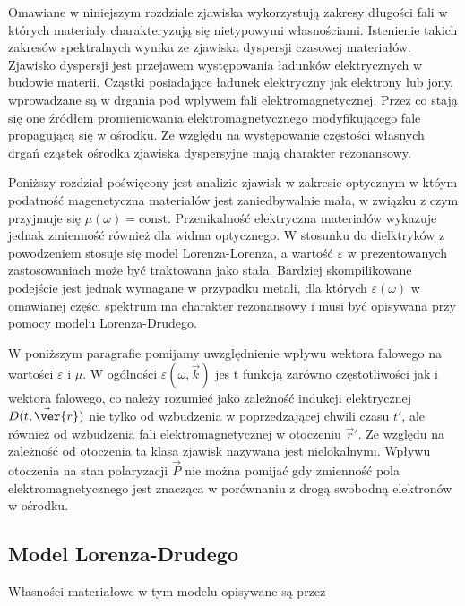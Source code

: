 Omawiane w niniejszym rozdziale zjawiska wykorzystują zakresy długości fali w których materiały charakteryzują się nietypowymi własnościami. Istenienie takich zakresów spektralnych wynika ze zjawiska dyspersji czasowej materiałów. Zjawisko dyspersji jest przejawem występowania ładunków elektrycznych w budowie materii. Cząstki posiadające ładunek elektryczny jak elektrony lub jony, wprowadzane są w drgania pod wpływem fali elektromagnetycznej. Przez co stają się one źródłem promieniowania elektromagnetycznego modyfikującego fale propagującą się w ośrodku. Ze względu na występowanie częstości własnych drgań cząstek ośrodka zjawiska dyspersyjne mają charakter rezonansowy.

Poniższy rozdział poświęcony jest analizie zjawisk w zakresie optycznym w któym podatność magenetyczna materiałów jest zaniedbywalnie mała, w związku z czym przyjmuje się $\mu(\omega)=\textrm{const}$. Przenikalność elektryczna materiałów wykazuje jednak zmienność również dla widma optycznego. W stosunku do dielktryków z powodzeniem stosuje się model Lorenza-Lorenza, a wartość $\varepsilon$ w prezentowanych zastosowaniach może być traktowana jako stała. Bardziej skompilikowane podejście jest jednak wymagane w przypadku metali, dla których $\varepsilon(\omega)$ w omawianej części spektrum ma charakter rezonansowy i musi być opisywana przy pomocy modelu Lorenza-Drudego.

W poniższym paragrafie pomijamy uwzględnienie wpływu wektora falowego na wartości $\varepsilon$ i $\mu$. W ogólności $\varepsilon(\omega,\vec{k})$ jes t funkcją zarówno częstotliwości jak i wektora falowego, co należy rozumieć jako zależność indukcji elektrycznej $\vec{D(t,\ver{r})}$ nie tylko od wzbudzenia w poprzedzającej chwili czasu $t'$, ale również od wzbudzenia fali elektromagnetycznej w otoczeniu $\vec{r}'$. Ze względu na zależność od otoczenia ta klasa zjawisk nazywana jest nielokalnymi. Wpływu otoczenia na stan polaryzacji $\vec{P}$ nie można pomijać gdy zmienność pola elektromagnetycznego jest znacząca w porównaniu z drogą swobodną elektronów w ośrodku.

\subsection{Model Lorenza-Drudego}
Własności materiałowe w tym modelu opisywane są przez

